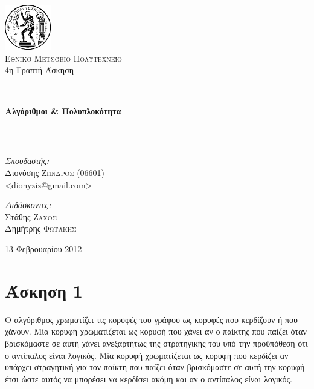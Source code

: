 \documentclass[11pt,a4paper,oneside]{report}
\newcommand{\HRule}{\rule{\linewidth}{0.5mm}}
\begin{document}
\begin{titlepage}
\begin{center}

\includegraphics[width=0.15\textwidth]{Pyrforos3.png}\\[1cm]
\textsc{\LARGE Εθνικό Μετσόβιο Πολυτεχνείο}\\[1.5cm]

\Large{ 4η Γραπτή Άσκηση }\\[0.5cm]

\begin{doublespace}
\HRule \\[0.4cm]
{\huge \bfseries
Αλγόριθμοι \& Πολυπλοκότητα
}\\[0.4cm]
\end{doublespace}

\HRule \\[1.5cm]

\begin{minipage}{0.4\textwidth}
\begin{flushleft} \large
\emph{Σπουδαστής:} \\
Διονύσης \textsc{Ζήνδρος} (06601)\\
\textlatin{\textless dionyziz@gmail.com\textgreater}
\end{flushleft}
\end{minipage}
\begin{minipage}{0.4\textwidth}
\begin{flushright} \large
\emph{Διδάσκοντες:} \\
Στάθης \textsc{Ζάχος}\\
Δημήτρης \textsc{Φωτάκης}
\end{flushright}
\end{minipage}

\vfill

{\large 13 Φεβρουαρίου 2012}
\end{center}
\end{titlepage}

\section*{Άσκηση 1}
Ο αλγόριθμος χρωματίζει τις κορυφές του γράφου ως κορυφές που κερδίζουν ή που χάνουν. Μία κορυφή χρωματίζεται ως κορυφή που χάνει αν ο παίκτης που παίζει όταν βρισκόμαστε σε αυτή χάνει ανεξαρτήτως της στρατηγικής του υπό την προϋπόθεση ότι ο αντίπαλος είναι λογικός. Μία κορυφή χρωματίζεται ως κορυφή που κερδίζει αν υπάρχει στραγητική για τον παίκτη που παίζει όταν βρισκόμαστε σε αυτή την κορυφή έτσι ώστε αυτός να μπορέσει να κερδίσει ακόμη και αν ο αντίπαλος είναι λογικός.
\end{document}
